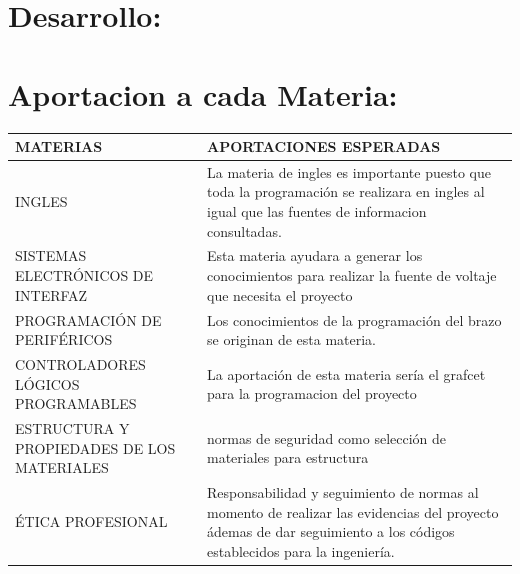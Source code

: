 \documentclass[14pt,a4paper]{article}
\begin{document}
\newpage

\section{Desarrollo:}

\section{Aportacion a cada Materia:}

\begin{tabular}{|p{70mm}|p{70mm}|} 

\hline
	MATERIAS & APORTACIONES ESPERADAS\\
\hline
	INGLES & La materia de ingles es importante puesto que toda la programación se realizara en ingles al igual que las fuentes de informacion consultadas.\\
\hline
	SISTEMAS ELECTRÓNICOS DE INTERFAZ & Esta materia ayudara a generar los conocimientos para realizar la fuente de voltaje que necesita el proyecto\\
\hline
	PROGRAMACIÓN DE PERIFÉRICOS & Los conocimientos de la programación del brazo se originan de esta materia.\\
\hline
	CONTROLADORES LÓGICOS PROGRAMABLES & La aportación de esta materia sería el grafcet para la  programacion del proyecto\\
\hline
	ESTRUCTURA Y PROPIEDADES DE LOS MATERIALES & normas de seguridad como selección de materiales para estructura\\
\hline
	ÉTICA PROFESIONAL & Responsabilidad y seguimiento de normas al momento de realizar las evidencias del proyecto ádemas  de dar seguimiento a los códigos establecidos para la ingeniería.\\
\hline
\end{tabular}\\\\
\end{document}
